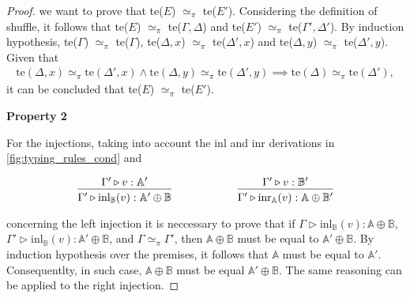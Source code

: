 \documentclass[10pt,a4paper]{amsart}
\theoremstyle{definition}
\theoremstyle{definition}
\theoremstyle{definition}
\theoremstyle{definition}
\theoremstyle{definition}
\theoremstyle{definition}
\begin{document}
\begin{proof}
we want to prove that te($E$) $\simeq_{\pi}$  te($E'$). Considering the definition of shuffle, it follows that  te($E$) $\simeq_{\pi}$  te($\Gamma, \Delta$) and te($E'$) $\simeq_{\pi}$  te($\Gamma', \Delta'$). By induction hypothesis, te($\Gamma$) $\simeq_{\pi}$  te($\Gamma$), te($\Delta,x$) $\simeq_{\pi}$  te($\Delta',x$) and te($\Delta,y$) $\simeq_{\pi}$  te($\Delta',y$). Given that 
\begin{align*}
     \text{te}(\Delta,x) \simeq_{\pi}  \text{te}(\Delta',x) \land \text{te}(\Delta,y) \simeq_{\pi}  \text{te}(\Delta',y) 
    \implies \text{te}(\Delta) \simeq_{\pi}  \text{te}(\Delta'), 
  \end{align*}
 it can be concluded that te($E$) $\simeq_{\pi}$  te($E'$).




\vspace{10pt}
\textbf{Property 2}

For the injections, taking into account the inl and inr derivations in \autoref{fig:typing_rules_cond} and


  \begin{figure} [H]
    \begin{equation*}
    \begin{aligned}
      &
      \begin{prooftree}
      \hypo{\Gamma' \triangleright v: \mathbb{A}'}
      \infer1[]{\Gamma' \triangleright \text{inl}_{\mathbb{B}}(v): \mathbb{A}' \oplus \mathbb{B}}
      \end{prooftree}
      \hspace{60pt}
      \begin{prooftree}
      \hypo{\Gamma' \triangleright v: \mathbb{B}'}
      \infer1[]{\Gamma' \triangleright \text{inr}_{\mathbb{A}}(v): \mathbb{A} \oplus \mathbb{B}'},
      \end{prooftree} \\
    \end{aligned}
    \end{equation*}
    \end{figure}

   

concerning the left injection it is neccessary to prove that if $\Gamma \triangleright \text{inl}_{\mathbb{B}}(v):  \mathbb{A} \oplus \mathbb{B}$, $\Gamma' \triangleright \text{inl}_{\mathbb{B}}(v):  \mathbb{A'} \oplus \mathbb{B}$, and $\Gamma \simeq_{\pi} \Gamma' $, then $\mathbb{A} \oplus \mathbb{B} $ must be equal to $\mathbb{A}'\oplus \mathbb{B}$. By induction hypothesis over the premises, it follows that $\mathbb{A} $ must be equal to $\mathbb{A}'$. Consequentlty, in such case, $\mathbb{A}\oplus \mathbb{B}$ must be equal $\mathbb{A'}\oplus \mathbb{B}$.  The same reasoning can be applied to the right injection.


\end{proof}
\end{document}

